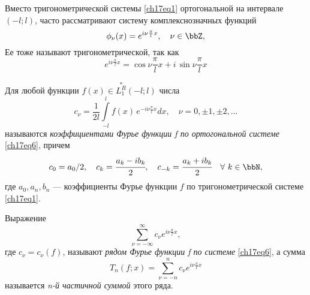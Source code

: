 Вместо тригонометрической системы \eqref{ch17eq1} ортогональной на интервале $(-l;l)$, часто рассматривают систему комплекснозначных функций
\begin{equation} \label{ch17eq6}
\phi_{\nu}(x) = e^{i\nu\frac{\pi}{l}x},\quad \nu \in \bbZ,
\end{equation}
Ее тоже называют тригонометрической, так как
$$
e^{i\nu\frac{\pi}{l}x} = \cos \nu\frac{\pi}{l}x + i\, \sin \nu\frac{\pi}{l}x
$$
\begin{defn}
Для любой функции $f(x) \in \overset{*}{L^{R}_1}(-l;l)$ числа
\begin{equation}
c_{\nu} = \frac{1}{2l} \int\limits_{-l}^{l} f(x)\, e^{-i\nu\frac{\pi}{l}x}dx,\quad \nu = 0,\pm 1, \pm 2,\ldots
\end{equation}
называются \textit{коэффициентами Фурье функции f по ортогональной системе} \eqref{ch17eq6}, причем
\begin{equation}
c_0 = a_0/2, \quad c_{k} = \cfrac{a_k - ib_k}{2}, \quad c_{-k} = \cfrac{a_k + ib_k}{2} \quad \forall\ k \in \bbN,
\end{equation}
где $a_0, a_n, b_n$ --- коэффициенты Фурье функции $f$ по тригонометрической системе \eqref{ch17eq1}.
\end{defn}

\begin{defn}
Выражение
$$
\sum_{\nu = -\infty}^{\infty} c_{\nu}e^{i\nu\frac{\pi}{l}x},
$$
где $c_{\nu} = c_{\nu}(f)$, называют \textit{рядом Фурье функции f по системе} \eqref{ch17eq6}, а сумма
$$
T_{n}(f;x) = \sum_{\nu = -n}^{n} c_{\nu}e^{i\nu\frac{\pi}{l}x}
$$
называется \textit{n-й частичной суммой} этого ряда.
\end{defn}

